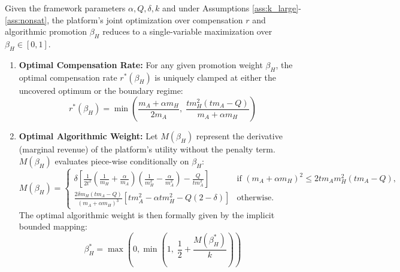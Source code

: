 \begin{proposition}
\label{prop:optimal:r_beta:View-Based}
Given the framework parameters $\alpha, Q, \delta, k$ and under Assumptions \ref{ass:k_large}-\ref{ass:nonsat}, the platform's joint optimization over compensation $r$ and algorithmic promotion $\beta_H$ reduces to a single-variable maximization over $\beta_H \in [0,1]$. 

\begin{enumerate}
    \item \textbf{Optimal Compensation Rate:} For any given promotion weight $\beta_H$, the optimal compensation rate $r^*(\beta_H)$ is uniquely clamped at either the uncovered optimum or the boundary regime:
    \begin{equation}
        r^*(\beta_H) = \min\left( \frac{m_A + \alpha m_H}{2m_A}, \; \frac{t m_H^2 (t m_A - Q)}{m_A + \alpha m_H} \right)
    \end{equation}
    
    \item \textbf{Optimal Algorithmic Weight:} Let $M(\beta_H)$ represent the derivative (marginal revenue) of the platform's utility without the penalty term. $M(\beta_H)$ evaluates piece-wise conditionally on $\beta_H$:
    \begin{equation}
        M(\beta_H) = 
        \begin{cases}
            \delta \left[ \frac{1}{2t^2} \left( \frac{1}{m_H} + \frac{\alpha}{m_A} \right) \left( \frac{1}{m_H^2} - \frac{\alpha}{m_A^2} \right) - \frac{Q}{t m_A^2} \right] & \text{if } (m_A + \alpha m_H)^2 \le 2 t m_A m_H^2 (t m_A - Q), \\[10pt]
            \frac{2\delta m_H (t m_A - Q)}{(m_A + \alpha m_H)^3} \left[ t m_A^2 - \alpha t m_H^2 - Q(2-\delta) \right] & \text{otherwise.}
        \end{cases}
    \end{equation}
    The optimal algorithmic weight is then formally given by the implicit bounded mapping:
    \begin{equation}
        \beta_H^* = \max\left(0, \min\left(1, \; \frac{1}{2} + \frac{M(\beta_H^*)}{k} \right)\right)
    \end{equation}
\end{enumerate}
\end{proposition}


